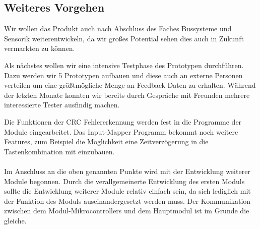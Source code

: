\subsection{Weiteres Vorgehen}
Wir wollen das Produkt auch nach Abschluss des Faches \glqq Bussysteme und Sensorik\grqq{} weiterentwickeln, da wir großes Potential sehen dies auch in Zukunft vermarkten zu können.

Als nächstes wollen wir eine intensive Testphase des Prototypen durchführen. Dazu werden wir 5 Prototypen aufbauen und diese auch an externe Personen verteilen um eine größtmögliche Menge an Feedback Daten zu erhalten.
Während der letzten Monate konnten wir bereits durch Gespräche mit Freunden mehrere interessierte Tester ausfindig machen.

Die Funktionen der CRC Fehlererkennung werden fest in die Programme der Module eingearbeitet. Das Input-Mapper Programm bekommt noch weitere Features, zum Beispiel die Möglichkeit eine Zeitverzögerung in die Tastenkombination mit einzubauen.
\\\\
Im Anschluss an die oben genannten Punkte wird mit der Entwicklung weiterer Module begonnen. Durch die verallgemeinerte Entwicklung des ersten Moduls sollte die Entwicklung weiterer Module relativ einfach sein, da sich lediglich mit der Funktion des Moduls auseinandergesetzt werden muss. Der Kommunikation zwischen dem Modul-Mikrocontrollers und dem Hauptmodul ist im Grunde die gleiche.
